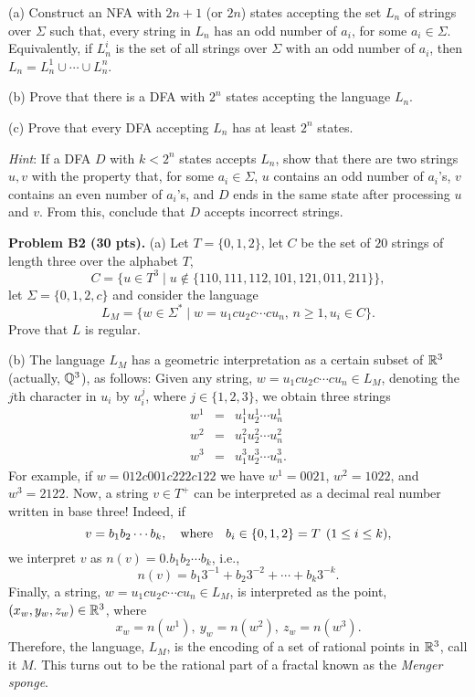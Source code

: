 \documentclass[12pt]{article}
\begin{document}
\medskip
(a) Construct an NFA with $2n+1$ (or $2n$) states accepting the
set $L_n$ of strings over $\Sigma$ such that,
every string in $L_n$ has an odd number of $a_i$, for some $a_i\in\Sigma$.
Equivalently, if $L_{n}^{i}$ is the set of all strings
over $\Sigma$ with an odd number of $a_i$, then
$L_n = L_{n}^{1}\cup \cdots \cup L_{n}^{n}$.

\medskip
(b) Prove that there is a DFA with $2^n$ states accepting the language
$L_n$.

\medskip
(c)
Prove that every DFA accepting $L_n$ has at least $2^n$ states.

\medskip\noindent
{\it Hint\/}: If a DFA $D$ with $k < 2^n$ states accepts $L_n$, show
that there are two strings $u, v$ with the property
that, for some $a_i\in\Sigma$, 
$u$ contains an odd number of $a_i$'s, 
$v$ contains an even number of $a_i$'s, 
and $D$ ends in the same state after processing
$u$ and $v$. From this, conclude that $D$ accepts 
incorrect strings.

\vspace{0.25cm}\noindent
{\bf Problem B2 (30 pts).}  
(a)
Let $T = \{0, 1, 2\}$, let $C$ be the set of $20$ strings
of length three over the alphabet $T$,
\[
C = \{u\in T^3 \mid u \notin \{110, 111, 112, 101, 121, 011, 211\}\},
\]
let $\Sigma = \{0, 1, 2, c\}$ and consider the language
\[
L_M = \{w \in \Sigma^* \mid
w = u_1cu_2c \cdots cu_n,\, n \geq 1, u_i \in C\}.
\]
Prove that $L$ is regular.

\medskip
(b)
The language $L_M$ has a geometric interpretation as a certain
subset of $\mathbb{R}^3$ (actually, $\mathbb{Q}^3$), as follows:
Given any string,
$w = u_1cu_2c \cdots cu_n \in L_M$, denoting the $j$th character
in $u_i$ by $u_i^j$, where $j\in \{1, 2, 3\}$, we obtain three
strings
\begin{eqnarray*}
w^1 & = & u_1^1u_2^1 \cdots u_n^1 \\
w^2 & = & u_1^2u_2^2 \cdots u_n^2 \\
w^3 & = & u_1^3u_2^3 \cdots u_n^3.
\end{eqnarray*}
For example, if $w = 012c001c222c122$ we have
$w^1 = 0021$, $w^2 = 1022$, and $w^3 = 2122$.
Now, a string $v\in T^+$ can be interpreted as a decimal real number
written in base three! Indeed, if
\[
v = b_1b_2\cdots b_k,
\quad\hbox{where}\quad
b_i\in \{0, 1, 2\} = T\>\> (1\leq i \leq k),
\]
we interpret $v$ as $n(v) = 0.b_1b_2\cdots b_k$, i.e.,
\[
n(v) = b_1 3^{-1} + b_2 3^{-2} + \cdots + b_k 3^{-k}.
\]
Finally, a string, $w = u_1cu_2c \cdots cu_n \in L_M$, is interpreted
as the point, $(x_w, y_w, z_w)\in \mathbb{R}^3$, where
\[
x_w  = n(w^1),\> y_w = n(w^2),\> z_w = n(w^3).
\]
Therefore, the language, $L_M$, is the encoding of a set of
rational points in $\mathbb{R}^3$, call it $M$.
This turns out to be the rational part of a fractal known as
the {\it Menger sponge\/}. 
\end{document}

